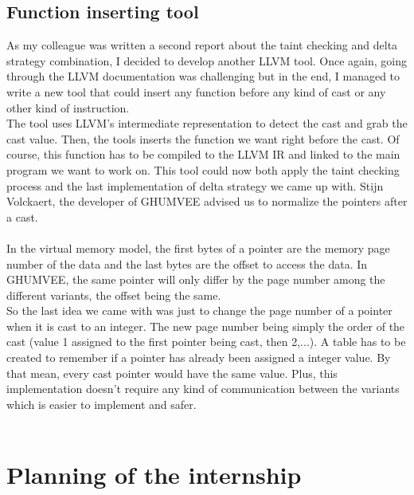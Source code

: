 \documentclass[english]{enstaPRE}
\begin{document}
\section{Function inserting tool}

As my colleague was written a second report about the taint checking and delta strategy combination, I decided to develop another 
LLVM tool. Once again, going through the LLVM documentation was challenging but in the end, I managed to write a new tool that could
insert any function before any kind of cast or any other kind of instruction. \\ 
The tool uses LLVM's intermediate representation to detect the cast and grab the cast value. Then, the tools inserts the function we
want right before the cast. Of course, this function has to be compiled to the LLVM IR and linked to the main program we want to
work on.
This tool could now both apply the taint checking process and the last implementation of delta strategy we came up with.
Stijn Volckaert, the developer of GHUMVEE advised us to normalize the pointers after a cast. \\ \\
In the virtual memory model, the first bytes of a pointer are the memory page number of the data and the last bytes are the offset
to access the data. In GHUMVEE, the same pointer will only differ by the page number among the different variants, the offset 
being the same. \\ So the last idea we came with was just to change the page number of a pointer when it is cast to an integer.
The new page number being simply the order of the cast (value 1 assigned to the first pointer being cast, then 2,...).
A table has to be created to remember if a pointer has already been assigned a integer value.
By that mean, every cast pointer would have the same value. Plus, this implementation doesn't require any kind of communication between
the variants which is easier to implement and safer.\\
 \\

\chapter{Planning of the internship}
\end{document}
